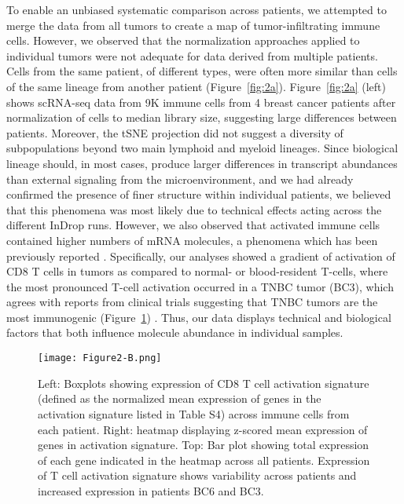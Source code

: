 To enable an unbiased systematic comparison across patients, we attempted to merge the data from all tumors to create a map of tumor-infiltrating immune cells. 
However, we observed that the normalization approaches applied to individual tumors were not adequate for data derived from multiple patients. 
Cells from the same patient, of different types, were often more similar than cells of the same lineage from another patient (Figure~\ref{fig:2a}). 
Figure~\ref{fig:2a} (left) shows scRNA-seq data from 9K immune cells from 4 breast cancer patients after normalization of cells to median library size, suggesting large differences between patients.
Moreover, the tSNE projection did not suggest a diversity of subpopulations beyond two main lymphoid and myeloid lineages. 
Since biological lineage should, in most cases, produce larger differences in transcript abundances than external signaling from the microenvironment, and we had already confirmed the presence of finer structure within individual patients, we believed that this phenomena was most likely due to technical effects acting across the different InDrop runs.
However, we also observed that activated immune cells contained higher numbers of mRNA molecules, a phenomena which has been previously reported \citep{Blackinton2016,Cheadle2005,Marrack2000,Singer2016}. 
Specifically, our analyses showed a gradient of activation of CD8 T cells in tumors as compared to normal- or blood-resident T-cells, where the most pronounced T-cell activation occurred in a TNBC tumor (BC3), which agrees with reports from clinical trials suggesting that TNBC tumors are the most immunogenic (Figure~\ref{fig:2b}) \citep{Dushyanthen2015,Garcia-Teijido2016}. 
Thus, our data displays technical and biological factors that both influence molecule abundance in individual samples. 

\begin{figure}
\centering
\texttt{[image: Figure2-B.png]}
\caption{Left: Boxplots showing expression of CD8 T cell activation signature (defined as the normalized mean expression of genes in the activation signature listed in Table S4) across immune cells from each patient. Right: heatmap displaying z-scored mean expression of genes in activation signature. Top: Bar plot showing total expression of each gene indicated in the heatmap across all patients. Expression of T cell activation signature shows variability across patients and increased expression in patients BC6 and BC3.} %
\label{fig:2b}
\end{figure}

